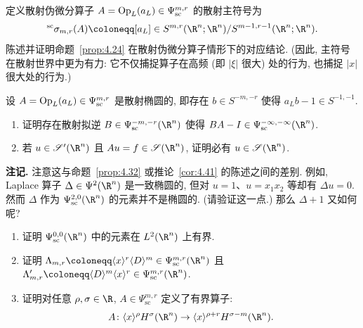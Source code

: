 \begin{exer}\label{ex:4.19}
定义散射伪微分算子 $A = \operatorname{Op}_L(a_L) \in \Psi_{\mathrm{sc}}^{m, r}$ 的散射主符号为
\begin{equation}\label{eq:4.177}
    {}^{\mathrm{sc}}\sigma_{m, r}(A) \defeq [a_L] \in S^{m, r}(\R^n; \R^n) / S^{m-1, r-1}(\R^n; \R^n).
\end{equation}
陈述并证明命题~\ref{prop:4.24} 在散射伪微分算子情形下的对应结论. (因此, 主符号在散射世界中更为有力: 它不仅捕捉算子在高频 (即 $|\xi|$ 很大) 处的行为, 也捕捉 $|x|$ 很大处的行为.)
\end{exer}

\begin{exer}\label{ex:4.20}
设 $A = \operatorname{Op}_L(a_L) \in \Psi_{\mathrm{sc}}^{m, r}$ 是散射椭圆的, 即存在 $b \in S^{-m, -r}$ 使得 $a_L b - 1 \in S^{-1, -1}$.
\begin{enumerate}
    \item 证明存在散射拟逆 $B \in \Psi_{\mathrm{sc}}^{-m, -r}(\R^n)$ 使得 $B A - I \in \Psi_{\mathrm{sc}}^{-\infty, -\infty}(\R^n)$.
    \item 若 $u \in \TempDistr(\R^n)$ 且 $A u = f \in \Schwartz(\R^n)$, 证明必有 $u \in \Schwartz(\R^n)$.
\end{enumerate}
\noindent\textbf{注记.} 注意这与命题~\ref{prop:4.32} 或推论~\ref{cor:4.41} 的陈述之间的差别. 例如, Laplace 算子 $\Delta \in \Psi^2(\R^n)$ 是一致椭圆的, 但对 $u = 1$、$u = x_1 x_2$ 等却有 $\Delta u = 0$. 然而 $\Delta$ 作为 $\Psi_{\mathrm{sc}}^{2, 0}(\R^n)$ 的元素并不是椭圆的. (请验证这一点.) 那么 $\Delta + 1$ 又如何呢?
\end{exer}

\begin{exer}\label{ex:4.21}
\begin{enumerate}
    \item 证明 $\Psi_{\mathrm{sc}}^{0, 0}(\R^n)$ 中的元素在 $L^2(\R^n)$ 上有界.
    \item 证明 $\Lambda_{m, r} \defeq \langle x \rangle^r \langle D \rangle^m \in \Psi_{\mathrm{sc}}^{m, r}(\R^n)$ 且 $\Lambda'_{m, r} \defeq \langle D \rangle^m \langle x \rangle^r \in \Psi_{\mathrm{sc}}^{m, r}(\R^n)$.
    \item 证明对任意 $\rho, \sigma \in \R$, $A \in \Psi_{\mathrm{sc}}^{m, r}$ 定义了有界算子:
    \begin{equation}\label{eq:4.178}
        A \colon \langle x \rangle^\rho H^\sigma(\R^n) \to \langle x \rangle^{\rho+r} H^{\sigma-m}(\R^n).
    \end{equation}
\end{enumerate}
\end{exer}

